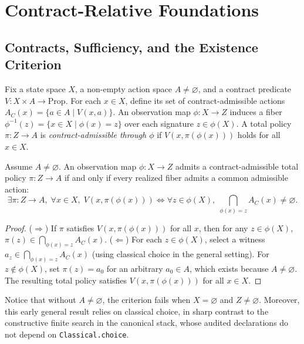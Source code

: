 \section{Contract-Relative Foundations}
\label{sec:foundations}

\subsection{Contracts, Sufficiency, and the Existence Criterion}
Fix a state space $X$, a non-empty action space $A \neq \varnothing$, and a contract predicate $V : X \times A \to \mathrm{Prop}$. For each $x \in X$, define its set of contract-admissible actions $A_C(x) = \{ a \in A \mid V(x, a) \}$. An observation map $\phi : X \to Z$ induces a fiber $\phi^{-1}(z) = \{ x \in X \mid \phi(x) = z \}$ over each signature $z \in \phi(X)$. A total policy $\pi : Z \to A$ is \emph{contract-admissible through $\phi$} if $V(x, \pi(\phi(x)))$ holds for all $x \in X$.

\begin{theorem}
\label{thm:sufficiency}
Assume $A \neq \varnothing$. An observation map $\phi : X \to Z$ admits a contract-admissible total policy $\pi : Z \to A$ if and only if every realized fiber admits a common admissible action:
\begin{equation}
\label{eq:sufficiency}
\exists \pi : Z \to A,\; \forall x \in X,\; V(x, \pi(\phi(x)))
\iff
\forall z \in \phi(X),\; \bigcap_{\phi(x) = z} A_C(x) \neq \varnothing.
\end{equation}
\end{theorem}

\begin{proof}
($\Rightarrow$) If $\pi$ satisfies $V(x, \pi(\phi(x)))$ for all $x$, then for any $z \in \phi(X)$, $\pi(z) \in \bigcap_{\phi(x)=z} A_C(x)$.
($\Leftarrow$) For each $z \in \phi(X)$, select a witness $a_z \in \bigcap_{\phi(x)=z} A_C(x)$ (using classical choice in the general setting). For $z \notin \phi(X)$, set $\pi(z) = a_0$ for an arbitrary $a_0 \in A$, which exists because $A \neq \varnothing$. The resulting total policy satisfies $V(x, \pi(\phi(x)))$ for all $x \in X$.
\end{proof}

Notice that without $A \neq \varnothing$, the criterion fails when $X = \varnothing$ and $Z \neq \varnothing$. Moreover, this early general result relies on classical choice, in sharp contrast to the constructive finite search in the canonical stack, whose audited declarations do not depend on \texttt{Classical.choice}.

